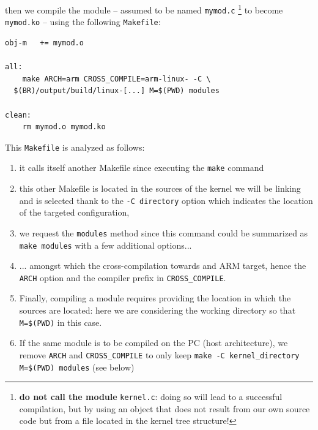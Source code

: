 \documentclass{article}
\begin{document}
{{\noindent
then we compile the module -- assumed to be named {\tt mymod.c}
\footnote{{\bf do not call the module} {\tt kernel.c}: doing so will lead
to a successful compilation, but by using an object that does not result
from our own source code but from a file located in the kernel tree structure!}
to become {\tt mymod.ko} -- using the following {\tt Makefile}:

\begin{lstlisting}
obj-m	+= mymod.o

all:
	make ARCH=arm CROSS_COMPILE=arm-linux- -C \
  $(BR)/output/build/linux-[...] M=$(PWD) modules

clean:
	rm mymod.o mymod.ko
\end{lstlisting}

This {\tt Makefile} is analyzed as follows:
\begin{enumerate}
\item it calls itself another Makefile since executing the {\tt make} command
\item this other Makefile is located in the sources of the kernel we will be linking and
is selected thank to the {\tt -C directory} option which indicates the location of the 
targeted configuration,
\item we request the {\tt modules} method since this command could be summarized as
{\tt make modules} with a few additional options...
\item ... amongst which the cross-compilation towards and ARM target, hence the {\tt ARCH}
option and the compiler prefix in {\tt CROSS\_COMPILE}.
\item Finally, compiling a module requires providing the location in which the sources are
located: here we are considering the working directory so that 
\verb~M=$(PWD)~ in this case.
\item If the same module is to be compiled on the PC (host architecture), we remove
{\tt ARCH} and {\tt CROSS\_COMPILE} to only keep {\tt make -C kernel\_directory M=\$(PWD) modules} (see below)
\end{enumerate}

}}
\end{document}
